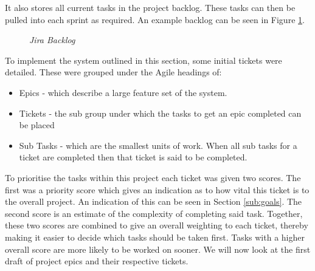 It also stores all current tasks in the project backlog. These tasks can then be pulled into each sprint as required. An example backlog can be seen in Figure \ref{fig:backlog}.

\begin{figure}[!ht]
\centering
{}
\caption{\em Jira Backlog}
\label{fig:backlog}
\end{figure}

\newpage
To implement the system outlined in this section, some initial tickets were detailed. These were grouped under the Agile headings of:

\begin{itemize}
	\item Epics - which describe a large feature set of the system.
	\item Tickets - the sub group under which the tasks to get an epic completed can be placed
	\item Sub Tasks - which are the smallest units of work. When all sub tasks for a ticket are completed then that ticket is said to be completed.
\end{itemize}

To prioritise the tasks within this project each ticket was given two scores. The first was a priority score which gives an indication as to how vital this ticket is to the overall project. An indication of this can be seen in Section \ref{sub:goals}. The second score is an estimate of the complexity of completing said task. Together, these two scores are combined to give an overall weighting to each ticket, thereby making it easier to decide which tasks should be taken first. Tasks with a higher overall score are more likely to be worked on sooner. We will now look at the first draft of project epics and their respective tickets.

